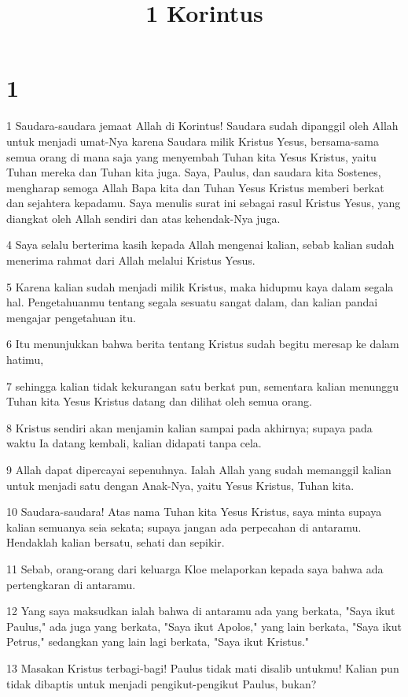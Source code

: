 

\title{1 Korintus}


\chapter{1}

\par 1 Saudara-saudara jemaat Allah di Korintus! Saudara sudah dipanggil oleh Allah untuk menjadi umat-Nya karena Saudara milik Kristus Yesus, bersama-sama semua orang di mana saja yang menyembah Tuhan kita Yesus Kristus, yaitu Tuhan mereka dan Tuhan kita juga. Saya, Paulus, dan saudara kita Sostenes, mengharap semoga Allah Bapa kita dan Tuhan Yesus Kristus memberi berkat dan sejahtera kepadamu. Saya menulis surat ini sebagai rasul Kristus Yesus, yang diangkat oleh Allah sendiri dan atas kehendak-Nya juga.
\par 4 Saya selalu berterima kasih kepada Allah mengenai kalian, sebab kalian sudah menerima rahmat dari Allah melalui Kristus Yesus.
\par 5 Karena kalian sudah menjadi milik Kristus, maka hidupmu kaya dalam segala hal. Pengetahuanmu tentang segala sesuatu sangat dalam, dan kalian pandai mengajar pengetahuan itu.
\par 6 Itu menunjukkan bahwa berita tentang Kristus sudah begitu meresap ke dalam hatimu,
\par 7 sehingga kalian tidak kekurangan satu berkat pun, sementara kalian menunggu Tuhan kita Yesus Kristus datang dan dilihat oleh semua orang.
\par 8 Kristus sendiri akan menjamin kalian sampai pada akhirnya; supaya pada waktu Ia datang kembali, kalian didapati tanpa cela.
\par 9 Allah dapat dipercayai sepenuhnya. Ialah Allah yang sudah memanggil kalian untuk menjadi satu dengan Anak-Nya, yaitu Yesus Kristus, Tuhan kita.
\par 10 Saudara-saudara! Atas nama Tuhan kita Yesus Kristus, saya minta supaya kalian semuanya seia sekata; supaya jangan ada perpecahan di antaramu. Hendaklah kalian bersatu, sehati dan sepikir.
\par 11 Sebab, orang-orang dari keluarga Kloe melaporkan kepada saya bahwa ada pertengkaran di antaramu.
\par 12 Yang saya maksudkan ialah bahwa di antaramu ada yang berkata, "Saya ikut Paulus," ada juga yang berkata, "Saya ikut Apolos," yang lain berkata, "Saya ikut Petrus," sedangkan yang lain lagi berkata, "Saya ikut Kristus."
\par 13 Masakan Kristus terbagi-bagi! Paulus tidak mati disalib untukmu! Kalian pun tidak dibaptis untuk menjadi pengikut-pengikut Paulus, bukan?
